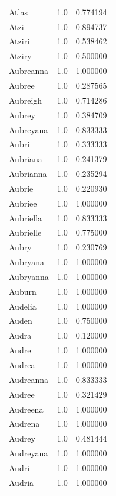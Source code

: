 \documentclass[
  letterpaper,
  DIV=11,
  numbers=noendperiod]{scrreprt}
\begin{document}
\begin{tabular}{lrr}
Atlas           &   1.0 &   0.774194 \\
Atzi            &   1.0 &   0.894737 \\
Atziri          &   1.0 &   0.538462 \\
Atziry          &   1.0 &   0.500000 \\
Aubreanna       &   1.0 &   1.000000 \\
Aubree          &   1.0 &   0.287565 \\
Aubreigh        &   1.0 &   0.714286 \\
Aubrey          &   1.0 &   0.384709 \\
Aubreyana       &   1.0 &   0.833333 \\
Aubri           &   1.0 &   0.333333 \\
Aubriana        &   1.0 &   0.241379 \\
Aubrianna       &   1.0 &   0.235294 \\
Aubrie          &   1.0 &   0.220930 \\
Aubriee         &   1.0 &   1.000000 \\
Aubriella       &   1.0 &   0.833333 \\
Aubrielle       &   1.0 &   0.775000 \\
Aubry           &   1.0 &   0.230769 \\
Aubryana        &   1.0 &   1.000000 \\
Aubryanna       &   1.0 &   1.000000 \\
Auburn          &   1.0 &   1.000000 \\
Audelia         &   1.0 &   1.000000 \\
Auden           &   1.0 &   0.750000 \\
Audra           &   1.0 &   0.120000 \\
Audre           &   1.0 &   1.000000 \\
Audrea          &   1.0 &   1.000000 \\
Audreanna       &   1.0 &   0.833333 \\
Audree          &   1.0 &   0.321429 \\
Audreena        &   1.0 &   1.000000 \\
Audrena         &   1.0 &   1.000000 \\
Audrey          &   1.0 &   0.481444 \\
Audreyana       &   1.0 &   1.000000 \\
Audri           &   1.0 &   1.000000 \\
Audria          &   1.0 &   1.000000 \\

\end{tabular}
\end{document}
